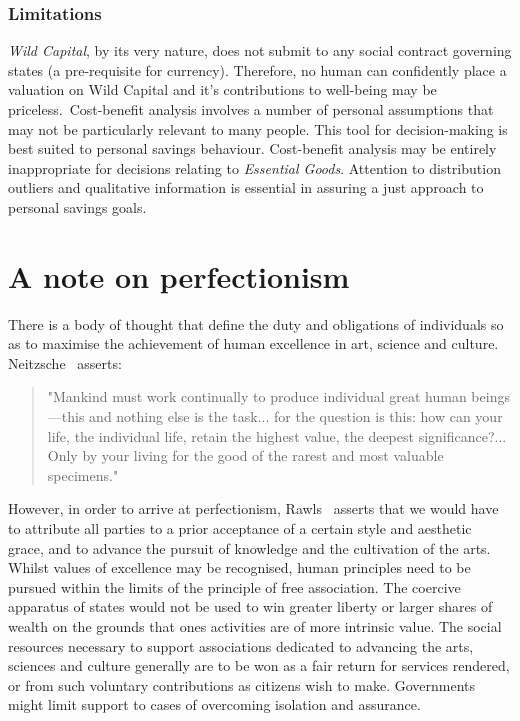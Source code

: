 \documentclass[11pt, oneside]{book}   	%
\begin{document}
\subsubsection{Limitations}

\emph{Wild Capital}, by its very nature, does not submit to any social contract governing states (a pre-requisite for currency).
Therefore, no human can confidently place a valuation on Wild Capital and it's contributions to well-being may be priceless.\
Cost-benefit analysis involves a number of personal assumptions that may not be particularly relevant to many people. This tool for decision-making is best suited to personal savings behaviour.
Cost-benefit analysis may be entirely inappropriate for decisions relating to \emph{Essential Goods}.
Attention to distribution outliers and qualitative information is essential in assuring a just approach to personal savings goals.

\section{A note on perfectionism}

There is a body of thought that define the duty and obligations of individuals so as to maximise the achievement of human excellence in art, science and culture. Neitzsche~\cite{gam1} asserts:

\begin{quote}
"Mankind must work continually to produce individual great human beings---this and nothing else is the task... for the question is this: how can your life, the individual life, retain the highest value, the deepest significance?... Only by your living for the good of the rarest and most valuable specimens."
\end{quote}
However, in order to arrive at perfectionism, Rawls~\cite{jr1} asserts that we would have to attribute all parties to a prior acceptance of a certain style and aesthetic grace, and to advance the pursuit of knowledge and the cultivation of the arts.
Whilst values of excellence may be recognised, human principles need to be pursued within the limits of the principle of free association.
The coercive apparatus of states would not be used to win greater liberty or larger shares of wealth on the grounds that ones activities are of more intrinsic value.
The social resources necessary to support associations dedicated to advancing the arts, sciences and culture generally are to be won as a fair return for services rendered, or from such voluntary contributions as citizens wish to make.
Governments might limit support to cases of overcoming isolation and assurance.
\end{document}
